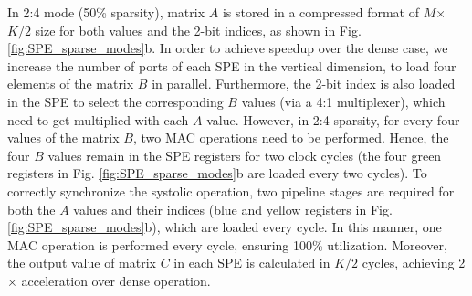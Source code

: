 In 2:4 mode (50\% sparsity), matrix $A$ is stored in a compressed format of $M$$\times$$K/2$ size for both values and the 2-bit indices, as shown in Fig. \ref{fig:SPE_sparse_modes}b.
In order to achieve speedup over the dense case, we increase the number of ports of each SPE in the vertical dimension, to load four elements of the matrix $B$ in parallel.
Furthermore, the 2-bit index is also loaded in the SPE to select the corresponding $B$ values (via a 4:1 multiplexer), which need to get multiplied with each $A$ value.
However, in 2:4 sparsity, for every four values of the matrix $B$, two MAC operations need to be performed.
Hence, the four $B$ values remain in the SPE registers for two clock cycles (the four green registers in Fig. \ref{fig:SPE_sparse_modes}b are loaded every two cycles).
To correctly synchronize the systolic operation, two pipeline stages are required for both the $A$ values and their indices (blue and yellow registers in Fig. \ref{fig:SPE_sparse_modes}b), which are loaded every cycle. 
In this manner, one MAC operation is performed every cycle, ensuring 100\% utilization.
Moreover, the output value of matrix $C$ in each SPE is calculated in $K/2$ cycles, achieving 2$\times$ acceleration over dense operation.




\begin{table}[t]
\centering
\caption{Summary of supported sparsity levels in SST slices.}

\setlength\tabcolsep{9pt}
\renewcommand{\arraystretch}{1.0}

\label{tb:sparsity_summary_benefits}

\vspace{-0.50cm}

\end{table}



